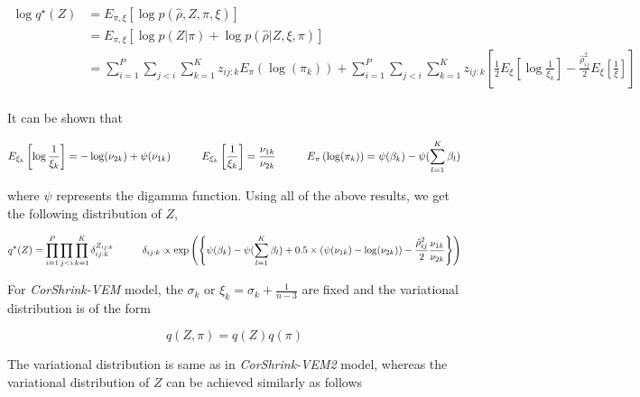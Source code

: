 \begin{align}
\log q^{\star} (Z)  & = E_{\pi, \xi} \left [  \log p ( \hat{\rho}, Z, \pi, \xi ) \right ]   \\
			  & = E_{\pi, \xi} \left [   \log p(Z | \pi) +  \log p (\hat{\rho} | Z, \xi, \pi) \right ] \\
			  & = \sum_{i=1}^{P} \sum_{j < i}  \sum_{k=1}^{K} z_{ij:k} E_{\pi} \left (  \log (\pi_{k}) \right)  + \sum_{i=1}^{P} \sum_{j < i}  \sum_{k=1}^{K} z_{ij:k}  \left [ \frac{1}{2}  E_{\xi} \left [ \log \frac{1}{\xi_{k}} \right] - \frac{\hat{\rho}^2_{ij}}{2}  E_{\xi} \left [ \frac{1}{\xi} \right ] \right] \\
\end{align}

It can be shown that 

\begin{equation}
E_{\xi_{k}} \left [ \log \frac{1}{\xi_{k}} \right]  = - \log (\nu_{2k}) + \psi(\nu_{1k})   \hspace{0.4 in} E_{\xi_{k}} \left [ \frac{1}{\xi_{k}} \right ]  = \frac{\nu_{1k}}{\nu_{2k}} \hspace{0.4in} E_{\pi} \left (  \log (\pi_{k}) \right)  = \psi (\beta_{k}) - \psi (\sum_{l=1}^{K} \beta_{l} )
\end{equation}

where $\psi$ represents the digamma function. Using all of the above results, we get the following distribution of $Z$,

\begin{equation}
 q^{\star}(Z) = \prod_{i=1}^{P} \prod_{j < i} \prod_{k=1}^{K} \delta_{ij:k}^{Z_{ij:k}} \hspace{0.4in} 
\delta_{ij:k} \propto \exp \left (   \left \{ \psi (\beta_{k}) - \psi (\sum_{l=1}^{K} \beta_{l} ) + 0.5 \times ( \psi(\nu_{1k}) - \log (\nu_{2k}) ) -  \frac{\hat{\rho}^2_{ij}}{2} \frac{\nu_{1k}}{\nu_{2k}} \right \}  \right ) 
\end{equation}


For \textit{CorShrink-VEM} model, the $\sigma_{k}$ or $\xi_{k} = \sigma_{k} + \frac{1}{n-3}$ are fixed and the variational distribution is of the form 

\begin{equation}
q(Z, \pi) = q(Z) q(\pi) 
\end{equation}

The variational distribution is same as in \textit{CorShrink-VEM2} model, whereas the variational distribution of $Z$ can be achieved similarly as follows 

